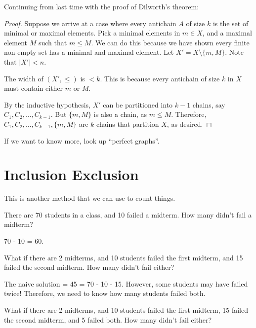 
Continuing from last time with the proof of Dilworth's theorem:

\begin{proof}
	Suppose we arrive at a case where every antichain \( A \) of size \( k \) is the set of minimal or maximal elements. Pick a minimal elements in \( m \in X \), and a maximal element \( M \) such that \( m\le M \). We can do this because we have shown every finite non-empty set has a minimal and maximal element. Let \( X' = X \setminus  \{m,M\}   \). Note that \( |X'| < n \).
	\begin{observe}
		The width of \( (X',\le ) \) is \( < k \). This is because every antichain of size \( k \) in \( X \) must contain either \( m \) or \( M \).
	\end{observe}
	By the inductive hypothesis, \( X' \) can be partitioned into \( k-1 \) chains, say \( C_{1},C_{2},\ldots ,C_{k-1} \). But \( \{m, M\}  \) is also a chain, as \( m\le M \). Therefore, \( C_{1},C_{2},\ldots ,C_{k-1},\{m,M\}   \) are \( k \) chains that partition \( X \), as desired.
\end{proof}

\begin{note}
	If we want to know more, look up ``perfect graphs''.
\end{note}

\section{Inclusion Exclusion}

This is another method that we can use to count things.

\begin{eg}
	There are 70 students in a class, and 10 failed a midterm. How many didn't fail a midterm?
\end{eg}

70 - 10 = 60.

\begin{eg}
	What if there are 2 midterms, and 10 students failed the first midterm, and 15 failed the second midterm. How many didn't fail either?
\end{eg}

The naive solution = 45 = 70 - 10 - 15. However, some students may have failed twice! Therefore, we need to know how many students failed both.

\begin{eg}
	What if there are 2 midterms, and 10 students failed the first midterm, 15 failed the second midterm, and 5 failed both. How many didn't fail either?
\end{eg}

